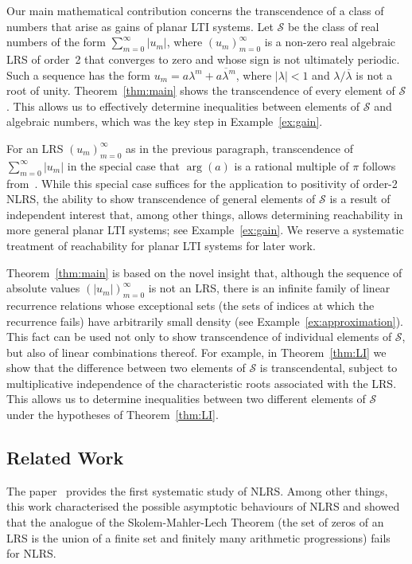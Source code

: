 \documentclass[a4paper,UKenglish,cleveref, autoref, thm-restate]{lipics-v2021}
\begin{document}
Our main mathematical contribution concerns the transcendence of a class of numbers that arise as gains of planar LTI systems.
Let $\mathcal S$ be the class of real numbers of the form
$\sum_{m=0}^\infty|u_m|$, where $(u_m)_{m=0}^\infty$ is a non-zero real algebraic LRS of order~2
that converges to zero and whose sign is not ultimately periodic.
Such a sequence has the form
$u_m=a\lambda^m + \overline{a\lambda^m}$, where
$|\lambda|<1$ and
$\lambda/\overline{\lambda}$ is not a root of unity.
Theorem~\ref{thm:main} shows the transcendence of
every element of $\mathcal S$.  This allows us to effectively determine inequalities 
between elements of $\mathcal S$ and algebraic numbers, which was the key step in Example~\ref{ex:gain}.

For an LRS $(u_m)_{m=0}^\infty$ as in the previous paragraph, transcendence of $\sum_{m=0}^\infty |u_m|$ 
in the special case that $\arg(a)$ is a rational multiple of $\pi$ follows from~\cite[Theorem 1(ii)]{LOW}.
While this special case suffices for the application to positivity of order-2 NLRS, the ability to show transcendence of general elements of $\mathcal S$
is a result of independent interest that, among other things, allows 
determining reachability in more general planar LTI systems; see Example~\ref{ex:gain}.  
We reserve a systematic treatment of reachability for planar LTI systems for later work.

Theorem~\ref{thm:main} is based on the novel insight that, although the sequence of absolute values $(|u_m|)_{m=0}^\infty$
is not an LRS, there is an infinite family of 
linear recurrence relations whose exceptional sets (the sets of indices at which the recurrence fails) have arbitrarily small density (see Example~\ref{ex:approximation}). 
This fact can be used not only to show transcendence of individual elements of $\mathcal S$, but also of linear combinations thereof.
For example, in Theorem~\ref{thm:LI} we show that the difference between two elements of $\mathcal S$ is transcendental, 
subject to multiplicative independence of the characteristic roots associated with the LRS.  
This allows us to determine inequalities between two different elements of $\mathcal S$ under the hypotheses of Theorem~\ref{thm:LI}.


\subsection{Related Work}
The paper~\cite{Akiyama2017} provides the first systematic study
of NLRS.  Among other things, this work characterised the possible
asymptotic behaviours of NLRS and showed that the analogue of the
Skolem-Mahler-Lech Theorem (the set of zeros of an LRS is the union of
a finite set and finitely many arithmetic progressions) fails for
NLRS.  
\end{document}
